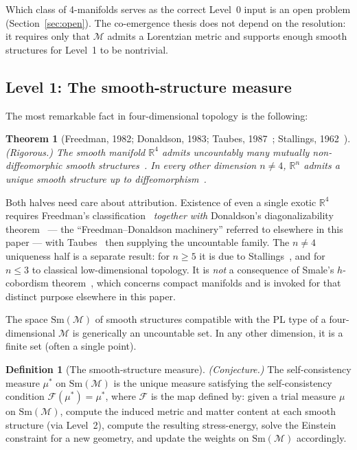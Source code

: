 \documentclass[12pt,a4paper]{article}
\newtheorem{theorem}{Theorem}
\theoremstyle{definition}
\newtheorem{definition}{Definition}
\theoremstyle{remark}
\begin{document}
Which class of 4-manifolds serves as the correct Level~0 input is an
open problem (Section~\ref{sec:open}). The co-emergence thesis does not
depend on the resolution: it requires only that $\mathcal{M}$ admits a
Lorentzian metric and supports enough smooth structures for Level~1 to
be nontrivial.

\subsection{Level 1: The smooth-structure measure}
\label{sec:level1}

The most remarkable fact in four-dimensional topology is the following:

\begin{theorem}[Freedman, 1982; Donaldson, 1983; Taubes,
1987~\cite{freedman,donaldson,taubes}; Stallings, 1962~\cite{stallings}]
\emph{(Rigorous.)}
\label{thm:exotic}
The smooth manifold $\mathbb{R}^4$ admits uncountably many mutually
non-diffeomorphic smooth structures~\cite{freedman,donaldson,taubes}. In every
other dimension $n \neq 4$, $\mathbb{R}^n$ admits a unique smooth structure up
to diffeomorphism~\cite{stallings}.
\end{theorem}

\noindent Both halves need care about attribution. Existence of even a single
exotic $\mathbb{R}^4$ requires Freedman's classification~\cite{freedman}
\emph{together with} Donaldson's diagonalizability theorem~\cite{donaldson} ---
the ``Freedman--Donaldson machinery'' referred to elsewhere in this paper ---
with Taubes~\cite{taubes} then supplying the uncountable family. The
$n \neq 4$ uniqueness half is a separate result: for $n \geq 5$ it is due to
Stallings~\cite{stallings}, and for $n \leq 3$ to classical low-dimensional
topology. It is \emph{not} a consequence of Smale's $h$-cobordism
theorem~\cite{smale}, which concerns compact manifolds and is invoked for that
distinct purpose elsewhere in this paper.

The space $\mathrm{Sm}(\mathcal{M})$ of smooth structures compatible
with the PL type of a four-dimensional $\mathcal{M}$ is generically an
uncountable set. In any other dimension, it is a finite set (often a
single point).

\begin{definition}[The smooth-structure measure]
\emph{(Conjecture.)}
\label{def:mu}
The self-consistency measure $\mu^*$ on $\mathrm{Sm}(\mathcal{M})$ is
the unique measure satisfying the self-consistency condition
$\mathcal{F}(\mu^*) = \mu^*$, where $\mathcal{F}$ is the map defined
by: given a trial measure $\mu$ on $\mathrm{Sm}(\mathcal{M})$, compute
the induced metric and matter content at each smooth structure (via
Level~2), compute the resulting stress-energy, solve the Einstein
constraint for a new geometry, and update the weights on
$\mathrm{Sm}(\mathcal{M})$ accordingly.
\end{definition}
\end{document}
